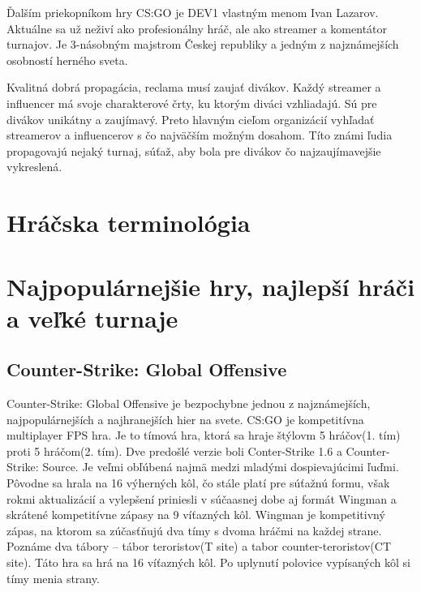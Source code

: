 \documentclass[10pt,oneside,slovak,a4paper]{article}
\begin{document}
Ďalším priekopníkom hry CS:GO je DEV1 vlastným menom Ivan Lazarov. Aktuálne sa už neživí ako profesionálny hráč, ale ako streamer a komentátor turnajov. Je 3-násobným majstrom Českej republiky a jedným z najznámejších osobností herného sveta.\cite{a6}

Kvalitná dobrá propagácia, reclama musí zaujať divákov. Každý streamer a influencer má svoje charakterové črty, ku ktorým diváci vzhliadajú. Sú pre divákov unikátny a zaujímavý. Preto hlavným cieľom organizácií vyhľadať streamerov a influencerov s čo najväčším možným dosahom. Títo známi ľudia propagovajú nejaký turnaj, súťaž, aby bola pre divákov čo najzaujímavejšie vykreslená.\cite{a1}




\section{Hráčska terminológia} \label{slovnik}

\section{Najpopulárnejšie hry, najlepší hráči a veľké turnaje} \label{hry} 

\subsection{Counter-Strike: Global Offensive} \label{hry:csgo}

Counter-Strike: Global Offensive je bezpochybne jednou z najznámejších, najpopulárnejších a najhranejších hier na svete. CS:GO je kompetitívna multiplayer FPS hra. Je to tímová hra, ktorá sa hraje štýlovm 5 hráčov(1. tím) proti 5 hráčom(2. tím). Dve predošlé verzie boli Conter-Strike 1.6 a Counter-Strike: Source. Je veľmi obľúbená najmä medzi mladými dospievajúcimi ľuďmi. Pôvodne sa hrala na 16 výherných kôl, čo stále platí pre súťažnú formu, však rokmi aktualizácií a vylepšení priniesli v súčaasnej dobe aj formát Wingman a skrátené kompetitívne zápasy na 9 víťazných kôl. Wingman je kompetitivný zápas, na ktorom sa zúčasťňujú dva tímy s dvoma hráčmi na každej strane. Poznáme dva tábory – tábor teroristov(T site) a tabor counter-teroristov(CT site). Táto hra sa hrá na 16 víťazných kôl. Po uplynutí polovice vypísaných kôl si tímy menia strany.\cite{a1}
\end{document}
